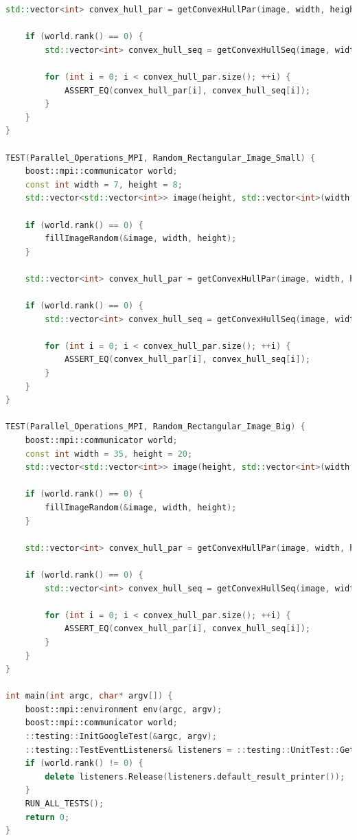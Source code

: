 \documentclass[a4paper, 12pt]{extarticle}
\begin{document}
\begin{lstlisting}[language=C++]
	std::vector<int> convex_hull_par = getConvexHullPar(image, width, height);
	
	if (world.rank() == 0) {
		std::vector<int> convex_hull_seq = getConvexHullSeq(image, width, height);
		
		for (int i = 0; i < convex_hull_par.size(); ++i) {
			ASSERT_EQ(convex_hull_par[i], convex_hull_seq[i]);
		}
	}
}

TEST(Parallel_Operations_MPI, Random_Rectangular_Image_Small) {
	boost::mpi::communicator world;
	const int width = 7, height = 8;
	std::vector<std::vector<int>> image(height, std::vector<int>(width, 0));
	
	if (world.rank() == 0) {
		fillImageRandom(&image, width, height);
	}
	
	std::vector<int> convex_hull_par = getConvexHullPar(image, width, height);
	
	if (world.rank() == 0) {
		std::vector<int> convex_hull_seq = getConvexHullSeq(image, width, height);
		
		for (int i = 0; i < convex_hull_par.size(); ++i) {
			ASSERT_EQ(convex_hull_par[i], convex_hull_seq[i]);
		}
	}
}

TEST(Parallel_Operations_MPI, Random_Rectangular_Image_Big) {
	boost::mpi::communicator world;
	const int width = 35, height = 20;
	std::vector<std::vector<int>> image(height, std::vector<int>(width, 0));
	
	if (world.rank() == 0) {
		fillImageRandom(&image, width, height);
	}
	
	std::vector<int> convex_hull_par = getConvexHullPar(image, width, height);
	
	if (world.rank() == 0) {
		std::vector<int> convex_hull_seq = getConvexHullSeq(image, width, height);
		
		for (int i = 0; i < convex_hull_par.size(); ++i) {
			ASSERT_EQ(convex_hull_par[i], convex_hull_seq[i]);
		}
	}
}

int main(int argc, char* argv[]) {
	boost::mpi::environment env(argc, argv);
	boost::mpi::communicator world;
	::testing::InitGoogleTest(&argc, argv);
	::testing::TestEventListeners& listeners = ::testing::UnitTest::GetInstance()->listeners();
	if (world.rank() != 0) {
		delete listeners.Release(listeners.default_result_printer());
	}
	RUN_ALL_TESTS();
	return 0;
}
\end{lstlisting}
\end{document}
